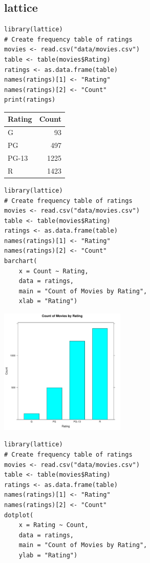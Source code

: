 \documentclass[a4paper, captions=tableheading]{tufte-book}
\begin{document}
\subsection{lattice}
\label{sec:orgheadline4}

\begin{verbatim}
library(lattice)
# Create frequency table of ratings
movies <- read.csv("data/movies.csv")
table <- table(movies$Rating)
ratings <- as.data.frame(table)
names(ratings)[1] <- "Rating"
names(ratings)[2] <- "Count"
print(ratings)
\end{verbatim}

\begin{center}
\begin{tabular}{lr}
\toprule
Rating & Count\\
\midrule
G & 93\\
PG & 497\\
PG-13 & 1225\\
R & 1423\\
\bottomrule
\end{tabular}
\end{center}

\begin{verbatim}
library(lattice)
# Create frequency table of ratings
movies <- read.csv("data/movies.csv")
table <- table(movies$Rating)
ratings <- as.data.frame(table)
names(ratings)[1] <- "Rating"
names(ratings)[2] <- "Count"
barchart(
	x = Count ~ Rating,
	data = ratings,
	main = "Count of Movies by Rating",
	xlab = "Rating")
\end{verbatim}

\includegraphics[height=6cm]{img/1-cat-lattice-01.pdf}

\begin{verbatim}
library(lattice)
# Create frequency table of ratings
movies <- read.csv("data/movies.csv")
table <- table(movies$Rating)
ratings <- as.data.frame(table)
names(ratings)[1] <- "Rating"
names(ratings)[2] <- "Count"
dotplot(
	x = Rating ~ Count,
	data = ratings,
	main = "Count of Movies by Rating",
	ylab = "Rating")
\end{verbatim}
\end{document}
